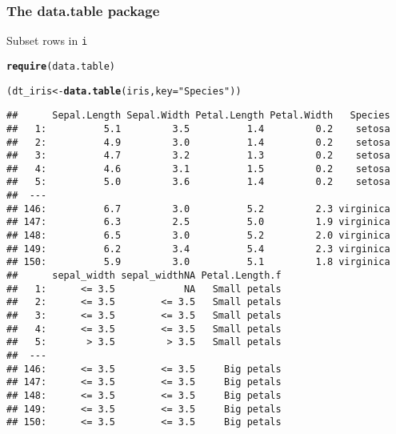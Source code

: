 \documentclass[paper=screen,mathserif]{beamer}\usepackage[]{graphicx}\usepackage[]{color}
\makeatletter
\newcommand{\hlstr}[1]{\textcolor[rgb]{0.192,0.494,0.8}{#1}}%
\newcommand{\hlstd}[1]{\textcolor[rgb]{0.345,0.345,0.345}{#1}}%
\newcommand{\hlkwb}[1]{\textcolor[rgb]{0.69,0.353,0.396}{#1}}%
\newcommand{\hlkwc}[1]{\textcolor[rgb]{0.333,0.667,0.333}{#1}}%
\newcommand{\hlkwd}[1]{\textcolor[rgb]{0.737,0.353,0.396}{\textbf{#1}}}%
\newenvironment{kframe}{%
 \def\at@end@of@kframe{}%
 \ifinner\ifhmode%
  \def\at@end@of@kframe{\end{minipage}}%
  \begin{minipage}{\columnwidth}%
 \fi\fi%
 \def\FrameCommand##1{\hskip\@totalleftmargin \hskip-\fboxsep
 \colorbox{shadecolor}{##1}\hskip-\fboxsep
     \hskip-\linewidth \hskip-\@totalleftmargin \hskip\columnwidth}%
 \MakeFramed {\advance\hsize-\width
   \@totalleftmargin\z@ \linewidth\hsize
   \@setminipage}}%
 {\par\unskip\endMakeFramed%
 \at@end@of@kframe}
\newenvironment{knitrout}{}{} %
\newcommand{\ft}[1]{\frametitle{#1}}
\makeatother
\begin{document}
\begin{frame}[fragile]
  \ft{The {\bf data.table} package}
  
  Subset rows in {\tt i}
\begin{knitrout}\scriptsize
{}\color{fgcolor}\begin{kframe}
\begin{alltt}
\hlkwd{require}\hlstd{(data.table)}
\end{alltt}


{\ttfamily\noindent\itshape\color{messagecolor}{\#\# Loading required package: data.table\\\#\# data.table 1.9.4\ \ For help type: ?data.table\\\#\# *** NB: by=.EACHI is now explicit. See README to restore previous behaviour.\\\#\# \\\#\# Attaching package: 'data.table'\\\#\# \\\#\# The following objects are masked from 'package:dplyr':\\\#\# \\\#\#\ \ \ \  between, last}}\begin{alltt}
\hlstd{(dt_iris} \hlkwb{<-} \hlkwd{data.table}\hlstd{(iris,} \hlkwc{key} \hlstd{=} \hlstr{"Species"}\hlstd{))}
\end{alltt}
\begin{verbatim}
##      Sepal.Length Sepal.Width Petal.Length Petal.Width   Species
##   1:          5.1         3.5          1.4         0.2    setosa
##   2:          4.9         3.0          1.4         0.2    setosa
##   3:          4.7         3.2          1.3         0.2    setosa
##   4:          4.6         3.1          1.5         0.2    setosa
##   5:          5.0         3.6          1.4         0.2    setosa
##  ---                                                            
## 146:          6.7         3.0          5.2         2.3 virginica
## 147:          6.3         2.5          5.0         1.9 virginica
## 148:          6.5         3.0          5.2         2.0 virginica
## 149:          6.2         3.4          5.4         2.3 virginica
## 150:          5.9         3.0          5.1         1.8 virginica
##      sepal_width sepal_widthNA Petal.Length.f
##   1:      <= 3.5            NA   Small petals
##   2:      <= 3.5        <= 3.5   Small petals
##   3:      <= 3.5        <= 3.5   Small petals
##   4:      <= 3.5        <= 3.5   Small petals
##   5:       > 3.5         > 3.5   Small petals
##  ---                                         
## 146:      <= 3.5        <= 3.5     Big petals
## 147:      <= 3.5        <= 3.5     Big petals
## 148:      <= 3.5        <= 3.5     Big petals
## 149:      <= 3.5        <= 3.5     Big petals
## 150:      <= 3.5        <= 3.5     Big petals
\end{verbatim}
\end{kframe}
\end{knitrout}

\end{frame}
\end{document}
